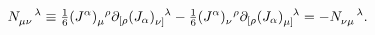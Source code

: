 \begin{equation*}
N_{\mu\nu}^{~~~\lambda} \equiv
\hbox{$\frac{1}{6}$} (J^\alpha)_\mu^{\!~~\rho}
\partial_{[\rho} (J_\alpha)_{\nu]}^{~~\lambda} -
\hbox{$\frac{1}{6}$} (J^\alpha)_\nu^{\!~~\rho}
\partial_{[\rho} (J_\alpha)_{\mu]}^{~~\lambda} = - N_{\nu\mu}^{~~~\lambda}.
\end{equation*}

